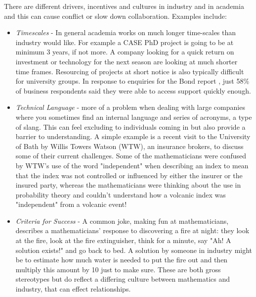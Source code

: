 \documentclass[11pt]{article} %
\begin{document}
	There are different drivers, incentives and cultures in industry and in academia and this can cause conflict or slow down collaboration. Examples include: 
	\begin{itemize}
		\item \textit{Timescales} - In general academia works on much longer time-scales than industry would like. For example a CASE PhD project is going to be at minimum 3 years, if not more. A company looking for a quick return on investment or technology for the next season are looking at much shorter time frames. Resourcing of projects at short notice is also typically difficult for university groups. In response to enquiries for the Bond report \cite{Bond}, just 58\% of business respondents said they were able to access support quickly enough. 
		\item \textit{Technical Language} -  more of a problem when dealing with large companies where you sometimes find an internal language and series of acronyms, a type of slang. This can feel excluding to individuals coming in but also provide a barrier to understanding. A simple example is a recent visit to the University of Bath by Willis Towers Watson (WTW), an insurance brokers, to discuss some of their current challenges. Some of the mathematicians were confused by WTW's use of the word "independent" when describing an index to mean that the index was not controlled or influenced by either the insurer or the insured party, whereas the mathematicians were thinking about the use in probability theory and couldn't understand how a volcanic index was "independent" from a volcanic event!
		\item \textit{Criteria for Success} - A common joke, making fun at mathematicians, describes  a mathematicians' response to discovering a fire at night: they look at the fire, look at the fire extinguisher, think for a minute, say "Ah! A solution exists!" and go back to bed. A solution by someone in industry might be to estimate how much water is needed to put the fire out and then multiply this amount by 10 just to make sure. These are both gross stereotypes but do reflect a differing culture between mathematics and industry, that can effect relationships.		
	\end{itemize}

	
\end{document}
